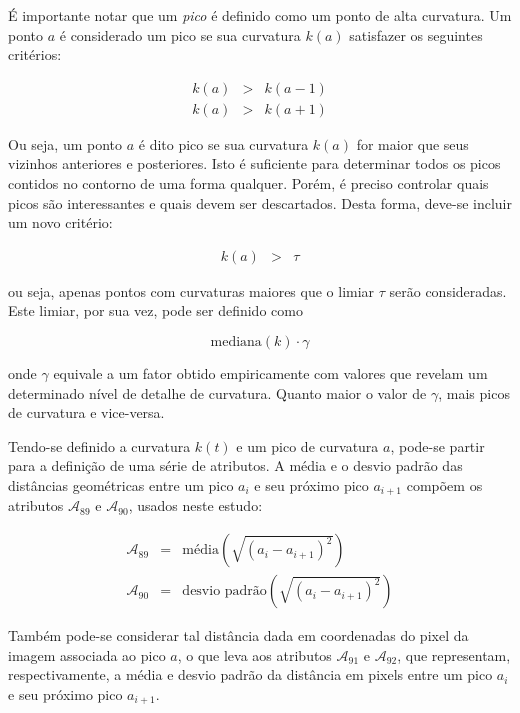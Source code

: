 É importante notar que um \emph{pico} é definido como um ponto de alta
curvatura. Um ponto $a$ é considerado um pico se sua curvatura $k(a)$
satisfazer os seguintes critérios:

\begin{eqnarray}
	k(a) & > & k(a-1) \\
	k(a) & > & k(a+1)
\end{eqnarray}

Ou seja, um ponto $a$ é dito pico se sua curvatura $k(a)$ for maior
que seus vizinhos anteriores e posteriores. Isto é suficiente para
determinar todos os picos contidos no contorno de uma forma
qualquer. Porém, é preciso controlar quais picos são interessantes e
quais devem ser descartados. Desta forma, deve-se incluir um novo
critério:

\begin{eqnarray}
  k(a) & > & \tau
\end{eqnarray}

\noindent ou seja, apenas pontos com curvaturas maiores que o limiar
$\tau$ serão consideradas. Este limiar, por sua vez, pode ser definido
como

\begin{equation}
	\text{mediana}\left(k\right) \cdot \gamma 
\end{equation}

\noindent onde $\gamma$ equivale a um fator obtido empiricamente com valores que
revelam um determinado nível de detalhe de curvatura. Quanto maior o valor de
$\gamma$, mais picos de curvatura e vice-versa.

Tendo-se definido a curvatura $k(t)$ e um pico de curvatura $a$, pode-se partir
para a definição de uma série de atributos. A média e o desvio padrão das
distâncias geométricas entre um pico $a_{i}$ e seu próximo pico $a_{i+1}$
compõem os atributos $\mathcal{A}_{89}$ e $\mathcal{A}_{90}$, usados neste
estudo:

\begin{eqnarray}
  \mathcal{A}_{89} & = & \text{média}(\sqrt{(a_{i} - a_{i+1})^2}) \\
  \mathcal{A}_{90} & = & \text{desvio padrão}(\sqrt{(a_{i} - a_{i+1})^2})
\end{eqnarray}

\noindent Também pode-se considerar tal distância dada em coordenadas do pixel
da imagem associada ao pico $a$, o que leva aos atributos $\mathcal{A}_{91}$ e
$\mathcal{A}_{92}$, que representam, respectivamente, a média e desvio padrão da
distância em pixels entre um pico $a_{i}$ e seu próximo pico $a_{i+1}$.

